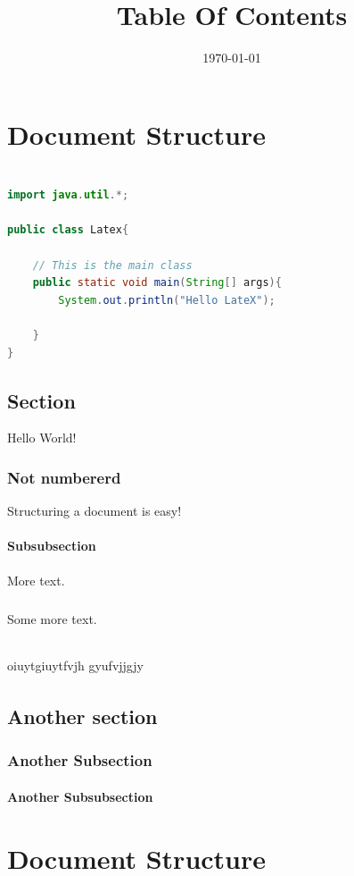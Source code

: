 \documentclass{book}
\title{Table Of Contents}
\date{\today}
\begin{document}
	\maketitle
	\tableofcontents

	\listoffigures
	
	\listoftables


\chapter{Document Structure}


		\begin{lstlisting}[language=Java]

import java.util.*;

public class Latex{

	// This is the main class
	public static void main(String[] args){
		System.out.println("Hello LateX");

	}	
}

		\end{lstlisting}
	\section{Section}
	Hello World!
	\subsection*{Not numbererd}
	Structuring a document is easy!
	\subsubsection{Subsubsection}
	More text.
	\paragraph{}
	Some more text.
	\subparagraph{}
	oiuytgiuytfvjh gyufvjjgjy
	
	\subparagraph{}
	\lipsum[1]
	\section{Another section}
	\subsection{Another Subsection}
	\subsubsection{Another Subsubsection}
	\lipsum[1-3]
\chapter{Document Structure}
\end{document}
